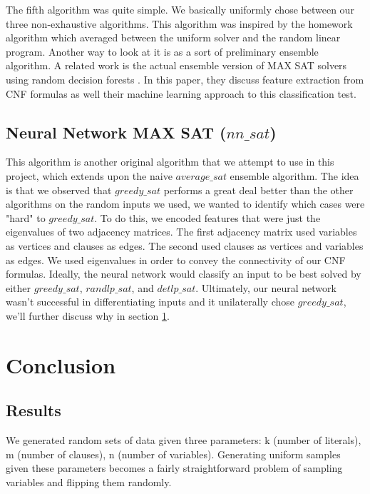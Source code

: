 \documentclass[paper=a4, fontsize=11pt]{scrartcl} %
\numberwithin{equation}{section} %
\numberwithin{figure}{section} %
\numberwithin{table}{section} %
\begin{document}
The fifth algorithm was quite simple.  We basically uniformly chose between our three non-exhaustive algorithms.  This algorithm was inspired by the homework algorithm which averaged between the uniform solver and the random linear program.  Another way to look at it is as a sort of preliminary ensemble algorithm.  A related work is the actual ensemble version of MAX SAT solvers using random decision forests \cite{POS-14:New_CNF_Features_and_Formula_Classification}.  In this paper, they discuss feature extraction from CNF formulas as well their machine learning approach to this classification test.

\subsection{Neural Network MAX SAT ($nn\_sat$)}

This algorithm is another original algorithm that we attempt to use in this project, which extends upon the naive $average\_sat$ ensemble algorithm.   The idea is that we observed that $greedy\_sat$ performs a great deal better than the other algorithms on the random inputs we used, we wanted to identify which cases were "hard" to $greedy\_sat$.  To do this, we encoded features that were just the eigenvalues of two adjacency matrices.  The first adjacency matrix used variables as vertices and clauses as edges.  The second used clauses as vertices and variables as edges.  We used eigenvalues in order to convey the connectivity of our CNF formulas.  Ideally, the neural network would classify an input to be best solved by either $greedy\_sat$, $randlp\_sat$, and $detlp\_sat$.  Ultimately, our neural network wasn't successful in differentiating inputs and it unilaterally chose $greedy\_sat$, we'll further discuss why in section \ref{Conclusion}.


\section{Conclusion}
\label{Conclusion}

\subsection{Results}
\label{Results}
 We generated random sets of data given three parameters: k (number of literals), m (number of clauses), n (number of variables).  Generating uniform samples given these parameters becomes a fairly straightforward problem of sampling variables and flipping them randomly.\\
\end{document}
